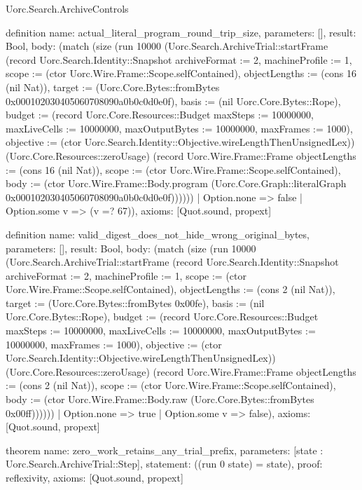 \begin{lexlean}{Uorc.Search.ArchiveControls}
\begin{semanticmodule}
definition{
  name: actual_literal_program_round_trip_size,
  parameters: [],
  result: Bool,
  body: (match (size (run 10000 (Uorc.Search.ArchiveTrial::startFrame (record Uorc.Search.Identity::Snapshot {archiveFormat := 2, machineProfile := 1, scope := (ctor Uorc.Wire.Frame::Scope.selfContained), objectLengths := (cons 16 (nil Nat)), target := (Uorc.Core.Bytes::fromBytes 0x000102030405060708090a0b0c0d0e0f), basis := (nil Uorc.Core.Bytes::Rope), budget := (record Uorc.Core.Resources::Budget {maxSteps := 10000000, maxLiveCells := 10000000, maxOutputBytes := 10000000, maxFrames := 1000}), objective := (ctor Uorc.Search.Identity::Objective.wireLengthThenUnsignedLex)}) (Uorc.Core.Resources::zeroUsage) (record Uorc.Wire.Frame::Frame {objectLengths := (cons 16 (nil Nat)), scope := (ctor Uorc.Wire.Frame::Scope.selfContained), body := (ctor Uorc.Wire.Frame::Body.program (Uorc.Core.Graph::literalGraph 0x000102030405060708090a0b0c0d0e0f))}))))
    | Option.none => false
    | Option.some v => (v =? 67)),
  axioms: [Quot.sound, propext]
}

definition{
  name: valid_digest_does_not_hide_wrong_original_bytes,
  parameters: [],
  result: Bool,
  body: (match (size (run 10000 (Uorc.Search.ArchiveTrial::startFrame (record Uorc.Search.Identity::Snapshot {archiveFormat := 2, machineProfile := 1, scope := (ctor Uorc.Wire.Frame::Scope.selfContained), objectLengths := (cons 2 (nil Nat)), target := (Uorc.Core.Bytes::fromBytes 0x00fe), basis := (nil Uorc.Core.Bytes::Rope), budget := (record Uorc.Core.Resources::Budget {maxSteps := 10000000, maxLiveCells := 10000000, maxOutputBytes := 10000000, maxFrames := 1000}), objective := (ctor Uorc.Search.Identity::Objective.wireLengthThenUnsignedLex)}) (Uorc.Core.Resources::zeroUsage) (record Uorc.Wire.Frame::Frame {objectLengths := (cons 2 (nil Nat)), scope := (ctor Uorc.Wire.Frame::Scope.selfContained), body := (ctor Uorc.Wire.Frame::Body.raw (Uorc.Core.Bytes::fromBytes 0x00ff))}))))
    | Option.none => true
    | Option.some v => false),
  axioms: [Quot.sound, propext]
}

theorem{
  name: zero_work_retains_any_trial_prefix,
  parameters: [state : Uorc.Search.ArchiveTrial::Step],
  statement: ((run 0 state) = state),
  proof: reflexivity{},
  axioms: [Quot.sound, propext]
}


\end{semanticmodule}
\end{lexlean}
